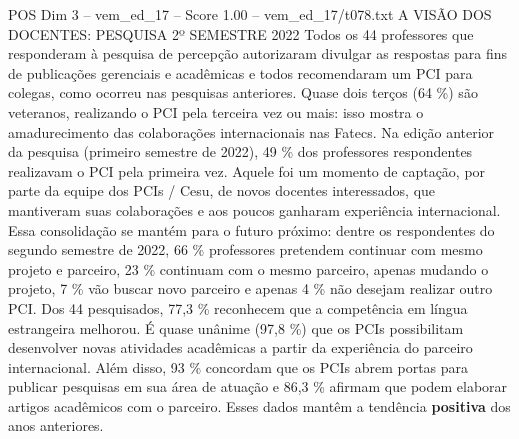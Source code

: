 \begin{textsample}{POS Dim 3 – vem\_ed\_17 – Score 1.00 – vem\_ed\_17/t078.txt}  \label{ex:f3_pos_177}
A VISÃO DOS DOCENTES: PESQUISA 2º SEMESTRE 2022 Todos os 44 professores que responderam à pesquisa de percepção autorizaram divulgar as respostas para fins de publicações gerenciais e acadêmicas e todos recomendaram um PCI para colegas, como ocorreu nas pesquisas anteriores.
Quase dois terços (64 \%) são veteranos, realizando o PCI pela terceira vez ou mais: isso mostra o amadurecimento das colaborações internacionais nas Fatecs.
Na edição anterior da pesquisa (primeiro semestre de 2022), 49 \% dos professores respondentes realizavam o PCI pela primeira vez.
Aquele foi um momento de captação, por parte da equipe dos PCIs / Cesu, de novos docentes interessados, que mantiveram suas colaborações e aos poucos ganharam experiência internacional.
Essa consolidação se mantém para o futuro próximo: dentre os respondentes do segundo semestre de 2022, 66 \% professores pretendem continuar com mesmo projeto e parceiro, 23 \% continuam com o mesmo parceiro, apenas mudando o projeto, 7 \% vão buscar novo parceiro e apenas 4 \% não desejam realizar outro PCI.
Dos 44 pesquisados, 77,3 \% reconhecem que a competência em língua estrangeira melhorou.
É quase unânime (97,8 \%) que os PCIs possibilitam desenvolver novas atividades acadêmicas a partir da experiência do parceiro internacional.
Além disso, 93 \% concordam que os PCIs abrem portas para publicar pesquisas em sua área de atuação e 86,3 \% afirmam que podem elaborar artigos acadêmicos com o parceiro.
Esses dados mantêm a tendência \textbf{positiva} dos anos anteriores.

\end{textsample}
